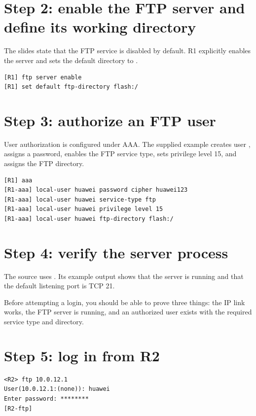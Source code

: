 \section{Step 2: enable the FTP server and define its working directory}
The slides state that the FTP service is disabled by default. R1 explicitly enables the server and sets the default directory to .
\begin{lstlisting}[style=dcnterminal]
[R1] ftp server enable
[R1] set default ftp-directory flash:/
\end{lstlisting}

\section{Step 3: authorize an FTP user}
User authorization is configured under AAA. The supplied example creates user , assigns a password, enables the FTP service type, sets privilege level 15, and assigns the FTP directory.
\begin{lstlisting}[style=dcnterminal]
[R1] aaa
[R1-aaa] local-user huawei password cipher huawei123
[R1-aaa] local-user huawei service-type ftp
[R1-aaa] local-user huawei privilege level 15
[R1-aaa] local-user huawei ftp-directory flash:/
\end{lstlisting}

\section{Step 4: verify the server process}
The source uses . Its example output shows that the server is running and that the default listening port is TCP 21.


\begin{verifybox}
Before attempting a login, you should be able to prove three things: the IP link works, the FTP server is running, and an authorized user exists with the required service type and directory.
\end{verifybox}

\section{Step 5: log in from R2}
\begin{lstlisting}[style=dcnterminal]
<R2> ftp 10.0.12.1
User(10.0.12.1:(none)): huawei
Enter password: ********
[R2-ftp]
\end{lstlisting}

